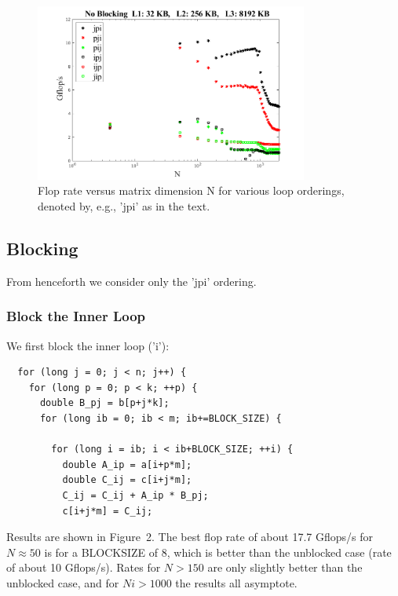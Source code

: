 \documentclass[12pt]{article}
\begin{document}
\begin{figure}[ht]
\vspace*{-0.05in}
\centering
    \includegraphics[width=0.8\textwidth]{Fig_1.png}
  \caption{Flop rate versus matrix dimension N for various
           loop orderings, denoted by, e.g., 'jpi' as in the text.}
  \label{fig1}
\end{figure}

\subsection*{Blocking}

From henceforth we consider only the 'jpi' ordering.

\subsubsection*{Block the Inner Loop}

We first block the inner loop ('i'):
\begin{singlespace}
\begin{verbatim}
  for (long j = 0; j < n; j++) {
    for (long p = 0; p < k; ++p) {
      double B_pj = b[p+j*k];
      for (long ib = 0; ib < m; ib+=BLOCK_SIZE) {

        for (long i = ib; i < ib+BLOCK_SIZE; ++i) {
          double A_ip = a[i+p*m];
          double C_ij = c[i+j*m];
          C_ij = C_ij + A_ip * B_pj;
          c[i+j*m] = C_ij;
\end{verbatim}
\end{singlespace}

Results are shown in Figure~2. The best flop rate of about 17.7 Gflops/s
for $N \approx 50$ is for a BLOCKSIZE of 8, which is better than the unblocked
case (rate of about 10 Gflops/s). 
Rates for $N > 150$ are only slightly better than the unblocked case,
and for $Ni > 1000$ the results all asymptote.
\end{document}
